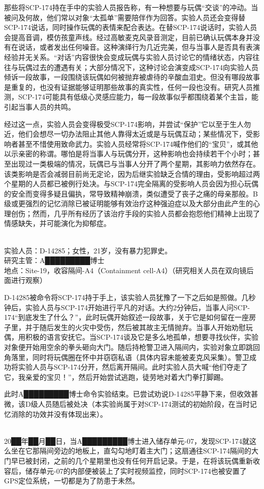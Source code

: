 那些将SCP-174持在手中的实验人员报告称，有一种想要与玩偶“交谈”的冲动。当被问及何故，他们常以对象“太孤单”需要陪伴作为回答。实验人员还会变得替SCP-174说话，同时操作玩偶的表情来配合表达。在替SCP-174说话时，实验人员会提高音调，模仿孩童声线。经过高敏麦克风录音测定，目前已确认玩偶本身并没有在说话，或者发出任何噪音。这种演绎行为几近完美，但与当事人是否具有表演经验并无关系。“对话”内容很快会变成玩偶与实验人员讨论它的情绪状态，内容往往与玩偶过去的遭遇有关；大部分情况下，这种讨论会演变成SCP-174向实验人员倾诉一段故事，一段围绕该玩偶如何被抛弃被虐待的辛酸血泪史。但没有哪段故事是重复的，也没有证据能够证明那些故事的真实性，任何一段也没有。研究人员推测，SCP-174可能具有低级心灵感应能力，每一段故事似乎都围绕着某个主旨，能引起当事人员的共鸣。

经过这一点，实验人员会变得极受SCP-174影响，并尝试“保护”它以至于生人勿近，他们会想尽一切办法阻止其他人靠得太近或是与玩偶互动；某些情况下，受影响者甚至不惜使用致命武力。实验人员经常将SCP-174喊作他们的“宝贝”，或其他以示亲密的称谓。哪怕是将当事人与玩偶分开，这种影响也会持续若干个小时；甚至出现过一类极端的情况，玩偶已与当事人分开了两个星期，其影响力依然存在。该类影响是否会减弱目前尚无定论，因为后继实验缺乏合情的理由，受影响超过两个星期的人员都已被例行处决。与SCP-174完全隔离的受影响人员会因为担心玩偶的安全而变得多疑且偏执，常导致精神崩溃，类似遭受了丧子之痛的母亲那般。B级或更强烈的记忆消除已被证明能够有效治疗这种强迫症以及大部分由此产生的心理创伤；然而，几乎所有经历了该治疗手段的实验人员都会抱怨他们精神上出现了情感缺失，并可能演化为抑郁症。

\\
实验人员：D-14285；女性，21岁，没有暴力犯罪史。\\
研究主管：A█████████博士\\
地点：Site-19，收容隔间-A4（Containment cell-A4）（研究相关人员在双向镜后面进行观察）

D-14285被命令将SCP-174持于手上，该实验人员犹豫了一下之后如是照做。几秒钟后，实验人员与SCP-174开始进行平凡的对话。大约2分钟后，当事人问SCP-174“到底发生了什么？”，此时玩偶开始叙述一段故事，关于它是如何留在一座房子里，并于随后发生的火灾中受伤，然后被其故主无情抛弃。当事人开始劝慰玩偶，用积极的语言安抚它。当SCP-174谈及它是多么地孤单，想要寻找伙伴，实验对象便开始用空余的拳头砸向大门。随后持枪警卫进入隔间内，实验对象立即跳回角落里，同时将玩偶圈在怀中并窃窃私语（具体内容未能被麦克风采集）。警卫成功将实验人员与SCP-174分开，然后离开隔间。此时实验人员大喊“他们夺走了它，我亲爱的宝贝！”，然后开始尝试逃跑，徒劳地对着大门拳打脚踢。

此时A█████████博士命令实验结束。已尝试劝说D-14285平静下来，但收效甚微，该D级人员随后被处决（本实验尚属于对SCP-174测试的初始阶段，在当时记忆消除的功效并没有体现出来）。

\\
20██年██月██日，当A█████████博士进入储存单元-07，发现SCP-174就这么坐在它那隔间旁边的地板上，直勾勾地盯着主大门；这扇通往SCP-174隔间的大门早已被封闭，之前的几个星期里也没有任何开启记录。于是，在将该玩偶重新收容后，储存单元-07的内部便被装上了实时视频监控，同时SCP-174也被安置了GPS定位系统，一切都是为了防患于未然。
